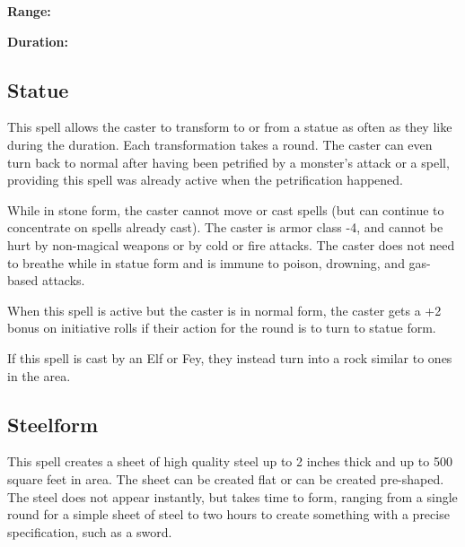 \begin{multicols*}{2}
{\textbf{Range:}

\textbf{Duration:} }



\subsection{Statue}\label{spell:Statue}

This spell allows the caster to transform to or from a statue as often as they like during the duration. Each transformation takes a round. The caster can even turn back to normal after having been petrified by a monster’s attack or a spell, providing this spell was already active when the petrification happened.

While in stone form, the caster cannot move or cast spells (but can continue to concentrate on spells already cast). The caster is armor class -4, and cannot be hurt by non-magical weapons or by cold or fire attacks. The caster does not need to breathe while in statue form and is immune to poison, drowning, and gas-based attacks.

When this spell is active but the caster is in normal form, the caster gets a +2 bonus on initiative rolls if their action for the round is to turn to statue form.

If this spell is cast by an Elf or Fey, they instead turn into a rock similar to ones in the area.

\subsection{Steelform}\label{spell:Steelform}

This spell creates a sheet of high quality steel up to 2 inches thick and up to 500 square feet in area. The sheet can be created flat or can be created pre-shaped. The steel does not appear instantly, but takes time to form, ranging from a single round for a simple sheet of steel to two hours to create something with a precise specification, such as a sword.


\end{multicols*}
